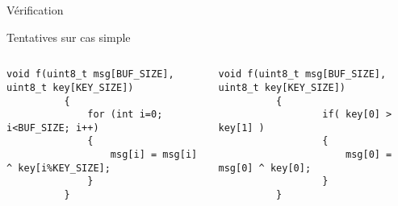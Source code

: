 \documentclass[A4,svgnames,9pt,aspectratio=169]{beamer}
\begin{document}

\begin{frame}[fragile]{Vérification}

  
  \begin{block}{Tentatives sur cas simple}
    \begin{columns}
      \begin{column}{0.5\textwidth}
        \begin{lstlisting}[style=CStyle, caption={good\_ct.c}, gobble=10]
          void f(uint8_t msg[BUF_SIZE], uint8_t key[KEY_SIZE])
          {
              for (int i=0; i<BUF_SIZE; i++)
              {
                  msg[i] = msg[i] ^ key[i%KEY_SIZE];
              }
          }
        \end{lstlisting}
      \end{column}
      \begin{column}{0.5\textwidth}
        \begin{lstlisting}[style=CStyle, caption={bad\_ct.c}, gobble=10]
          void f(uint8_t msg[BUF_SIZE], uint8_t key[KEY_SIZE])
          {
                  if( key[0] > key[1] )
                  {
                      msg[0] = msg[0] ^ key[0];    
                  }
          }
        \end{lstlisting}
      \end{column}
    \end{columns}
  \end{block}


\end{frame}
\end{document}
